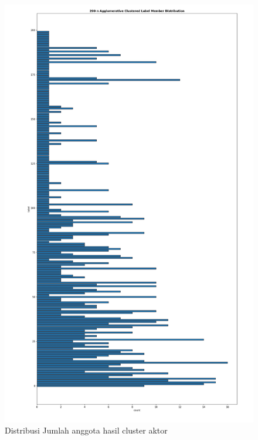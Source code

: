 \begin{figure}[H]
	\centering  
	\includegraphics[scale=0.38]{./Lampiran/gambar/200_NAggloClusteredMemberLabelDistribution}   
	\caption{Distribusi Jumlah anggota hasil cluster aktor }
	\label{fig:200_NAggloClusteredMemberLabelDistribution} 
\end{figure} 

